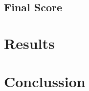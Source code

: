 \documentclass[11pt]{article}
\begin{document}
\subsection{Final Score}

\section{Results} \label{sec:results}

\section{Conclussion} \label{sec:conclussion}


{}
\end{document}
